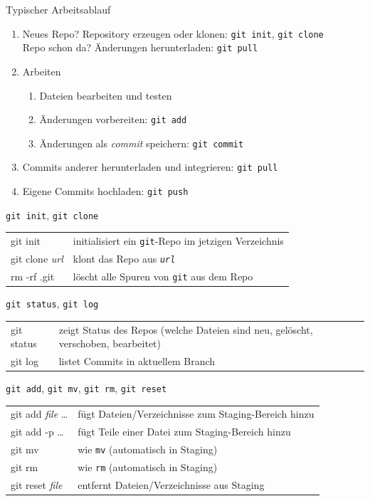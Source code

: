\begin{frame}{Typischer Arbeitsablauf}
  \begin{enumerate}
    \item Neues Repo? Repository erzeugen oder klonen: \hfill\texttt{git init}, \texttt{git clone} \\
      Repo schon da? Änderungen herunterladen: \hfill\texttt{git pull}
    \item Arbeiten
      \begin{enumerate}
        \item Dateien bearbeiten und testen
        \item Änderungen vorbereiten: \hfill\texttt{git add}
        \item Änderungen als \emph{commit} speichern: \hfill\texttt{git commit}
      \end{enumerate}
    \item Commits anderer herunterladen und integrieren: \hfill\texttt{git pull}
    \item Eigene Commits hochladen: \hfill\texttt{git push}
  \end{enumerate}
\end{frame}

\begin{frame}{\texttt{git init}, \texttt{git clone}}
  \begin{tabu}{>{\ttfamily}l X[,L]}
    git init               & initialisiert ein \texttt{git}-Repo im jetzigen Verzeichnis \\
    git clone \textit{url} & klont das Repo aus \texttt{\textit{url}} \\
    rm -rf .git            & löscht alle Spuren von \texttt{git} aus dem Repo
  \end{tabu}
\end{frame}

\begin{frame}{\texttt{git status}, \texttt{git log}}
  \begin{tabu}{>{\ttfamily}l X[,L]}
    git status & zeigt Status des Repos (welche Dateien sind neu, gelöscht, verschoben, bearbeitet) \\
    git log    & listet Commits in aktuellem Branch
  \end{tabu}
\end{frame}

\begin{frame}{\texttt{git add}, \texttt{git mv}, \texttt{git rm}, \texttt{git reset}}
  \begin{tabu}{>{\ttfamily}l X[,L]}
    git add \textit{file} … & fügt Dateien/Verzeichnisse zum Staging-Bereich hinzu \\
    git add -p …            & fügt Teile einer Datei zum Staging-Bereich hinzu \\
    git mv                  & wie \texttt{mv} (automatisch in Staging)\\
    git rm                  & wie \texttt{rm} (automatisch in Staging) \\
    git reset \textit{file} & entfernt Dateien/Verzeichnisse aus Staging
  \end{tabu}
\end{frame}

